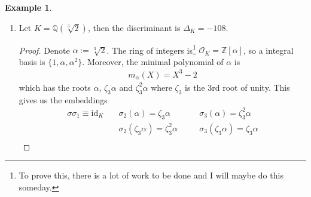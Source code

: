 \documentclass[a4paper]{book}
\theoremstyle{definition}
\newtheorem{example}{Example}[definition]
\newcommand{\set}[1]{\left\{\, #1 \,\right\}}
\begin{document}
\begin{example}
\begin{enumerate}
\begin{proof}
\begin{enumerate}
\begin{align*}
\begin{pmatrix}
                        \frac{1 + \sqrt{d}}{2} & \frac{1 - \sqrt{d}}{2}
                    \end{pmatrix}^2
                    = \left(\frac{1 - \sqrt{d}}{2} - \frac{1 + \sqrt{d}}{2}\right)^2
                    = \left(-\frac{2 \sqrt{d}}{2}\right)^2 = d \text{.}
                \end{align*}
                \item On the other hand, if \(\alpha = \sqrt{d}\), then a integral basis and its conjugate are
                \begin{align*}
                    \set{1, \sqrt{d}} \text{ and } \set{1, -\sqrt{d}}
                \end{align*}
                and hence we have
                \begin{align*}
                    \Delta_K = \begin{pmatrix}
                        1 & 1 \\
                        \sqrt{d} & -\sqrt{d}
                    \end{pmatrix}^2
                    = \left(-2\sqrt{d}\right)^2 = 4d \text{.}
                \end{align*}
            \end{enumerate}
            Conclude the stated result above.
        \end{proof}
    \item Let \(K = \mathbb{Q}(\sqrt[3]{2})\), then the discriminant is \(\Delta_K = -108\).
    \begin{proof}
        Denote \(\alpha := \sqrt[3]{2}\). The ring of integers is\footnote{To prove this, there is a lot of work to be done and I will maybe do this someday.} \(\mathcal{O}_K = \mathbb{Z}[\alpha]\), so a integral basis is \(\{1, \alpha, \alpha^2\}\). Moreover, the minimal polynomial of \(\alpha\) is
        \begin{align*}
            m_\alpha (X) = X^3 - 2
        \end{align*}
        which has the roots \(\alpha\), \(\zeta_3 \alpha\) and \(\zeta_3^2 \alpha\) where \(\zeta_3\) is the 3rd root of unity. This gives us the embeddings
        \begin{alignat*}
            \sigma \sigma_1 \equiv \mathrm{id}_K &\quad \sigma_2(\alpha) = \zeta_3 \alpha &&\quad \sigma_3(\alpha) = \zeta_3^2 \alpha \\
            &\quad \sigma_2(\zeta_3 \alpha) = \zeta_3^2 \alpha &&\quad \sigma_3(\zeta_3 \alpha) = \zeta_3 \alpha\\

\end{alignat*}
\end{proof}
\end{enumerate}
\end{example}
\end{document}
